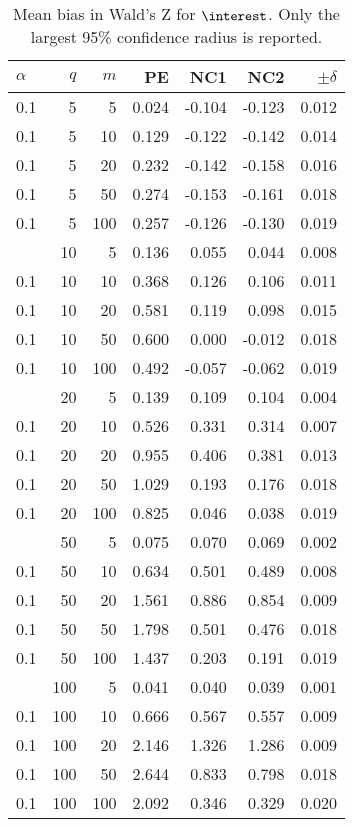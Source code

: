 \begin{table}

\caption{\label{tab:esratiosbias1}Mean bias in Wald's Z for $\interest$. Only the largest 95\% confidence radius is reported.}
\centering
\begin{tabular}[t]{lrrrrrr}
\toprule
$\alpha$ & $q$ & $m$ & PE & NC1 & NC2 & $\pm \delta$\\
\midrule
0.1 & 5 & 5 & 0.024 & -0.104 & -0.123 & 0.012\\
0.1 & 5 & 10 & 0.129 & -0.122 & -0.142 & 0.014\\
0.1 & 5 & 20 & 0.232 & -0.142 & -0.158 & 0.016\\
0.1 & 5 & 50 & 0.274 & -0.153 & -0.161 & 0.018\\
0.1 & 5 & 100 & 0.257 & -0.126 & -0.130 & 0.019\\
\addlinespace
0.1 & 10 & 5 & 0.136 & 0.055 & 0.044 & 0.008\\
0.1 & 10 & 10 & 0.368 & 0.126 & 0.106 & 0.011\\
0.1 & 10 & 20 & 0.581 & 0.119 & 0.098 & 0.015\\
0.1 & 10 & 50 & 0.600 & 0.000 & -0.012 & 0.018\\
0.1 & 10 & 100 & 0.492 & -0.057 & -0.062 & 0.019\\
\addlinespace
0.1 & 20 & 5 & 0.139 & 0.109 & 0.104 & 0.004\\
0.1 & 20 & 10 & 0.526 & 0.331 & 0.314 & 0.007\\
0.1 & 20 & 20 & 0.955 & 0.406 & 0.381 & 0.013\\
0.1 & 20 & 50 & 1.029 & 0.193 & 0.176 & 0.018\\
0.1 & 20 & 100 & 0.825 & 0.046 & 0.038 & 0.019\\
\addlinespace
0.1 & 50 & 5 & 0.075 & 0.070 & 0.069 & 0.002\\
0.1 & 50 & 10 & 0.634 & 0.501 & 0.489 & 0.008\\
0.1 & 50 & 20 & 1.561 & 0.886 & 0.854 & 0.009\\
0.1 & 50 & 50 & 1.798 & 0.501 & 0.476 & 0.018\\
0.1 & 50 & 100 & 1.437 & 0.203 & 0.191 & 0.019\\
\addlinespace
0.1 & 100 & 5 & 0.041 & 0.040 & 0.039 & 0.001\\
0.1 & 100 & 10 & 0.666 & 0.567 & 0.557 & 0.009\\
0.1 & 100 & 20 & 2.146 & 1.326 & 1.286 & 0.009\\
0.1 & 100 & 50 & 2.644 & 0.833 & 0.798 & 0.018\\
0.1 & 100 & 100 & 2.092 & 0.346 & 0.329 & 0.020\\

\end{tabular}
\end{table}
